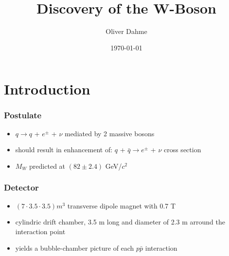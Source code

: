 \documentclass{beamer}
\title[Antineutrons]{Discovery of the W-Boson} %
\author{Oliver Dahme} %
\institute[UZH] %
{
University of Zurich \\ %
\medskip
\textit{o.dahme@cern.ch} %
}
\date{\today} %
\begin{document}
\begin{frame}
	\titlepage %
\end{frame}



\section{Introduction} %

\begin{frame}
	\frametitle{Postulate}
	\begin{itemize}
		\item $q \rightarrow q$ + $e^\pm$ + $\nu$ mediated by 2 massive bosons
		\item should result in enhancement of: $q$ + $\bar{q} \rightarrow e^\pm$ + $\nu$ cross section
		\item $M_W$ predicted at $(82 \pm 2.4)$ GeV/$c^2$
	\end{itemize}
\end{frame}

\begin{frame}
	\frametitle{Detector}
	\begin{itemize}
		\item $(7 \cdot 3.5 \cdot 3.5) m^3$ transverse dipole magnet with 0.7 T
		\item cylindric drift chamber, 3.5 m long and diameter of 2.3 m arround the interaction point
		\item yields a bubble-chamber picture of each $p \bar{p}$ interaction
	\end{itemize}
\end{frame}
\end{document}
